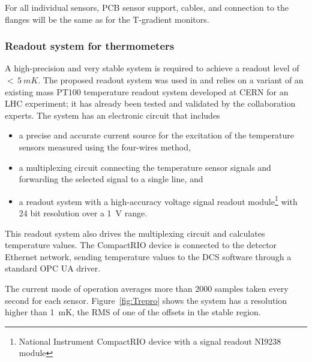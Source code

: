 For all individual sensors, PCB sensor support, cables, and connection to the flanges will be the same as for the T-gradient monitors. 
  



\subsubsection{Readout system for thermometers}
\label{sec:fdgen-slow-cryo-therm-readout}

A %
high-precision and very stable system is required to achieve a readout level of $<\,\SI{5}{mK}$.
The proposed readout system was used in  and relies on a variant of an existing mass PT100 temperature readout system developed at
CERN for an LHC experiment; it has already been tested and validated by the collaboration experts. The system has an electronic circuit that includes
\begin{itemize}
\item a precise and accurate current source for the excitation of the temperature sensors measured using the four-wires method,
\item a multiplexing circuit connecting the temperature sensor signals and forwarding the selected signal to a single line, and 
\item a readout system  with a high-accuracy voltage signal readout module\footnote{National Instrument CompactRIO\texttrademark{} device  with a signal readout NI9238\texttrademark{} module} with 24 bit resolution over a \SI{1}{V} range.
\end{itemize}
This readout system also drives the multiplexing circuit and calculates temperature values. The CompactRIO device is connected to the detector Ethernet network, sending temperature values to the DCS software through a standard OPC UA driver.

The current mode of operation averages more than \num{2000} samples taken every second for each sensor. 
Figure~\ref{fig:Trepro} shows the system has a resolution higher than 
\SI{1}{mK}, the RMS of one of the offsets in the stable region.


